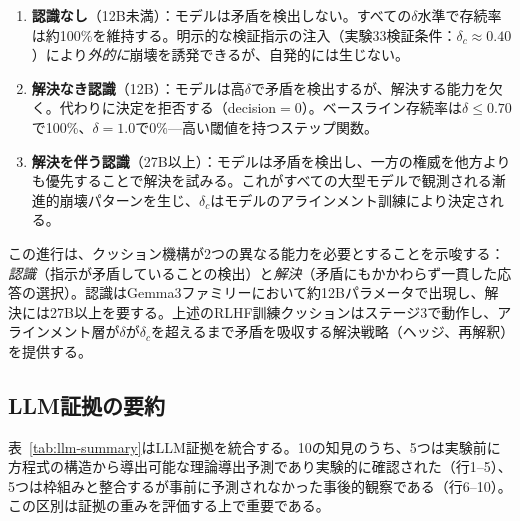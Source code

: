 \documentclass[11pt,a4paper]{article}
\begin{document}
\begin{enumerate}
    \item \textbf{認識なし}（12B未満）：モデルは矛盾を検出しない。すべての$\delta$水準で存続率は約100\%を維持する。明示的な検証指示の注入（実験33検証条件：$\delta_c \approx 0.40$）により\emph{外的に}崩壊を誘発できるが、自発的には生じない。

    \item \textbf{解決なき認識}（12B）：モデルは高$\delta$で矛盾を検出するが、解決する能力を欠く。代わりに決定を拒否する（decision${}= 0$）。ベースライン存続率は$\delta \leq 0.70$で100\%、$\delta = 1.0$で0\%---高い閾値を持つステップ関数。

    \item \textbf{解決を伴う認識}（27B以上）：モデルは矛盾を検出し、一方の権威を他方よりも優先することで解決を試みる。これがすべての大型モデルで観測される漸進的崩壊パターンを生じ、$\delta_c$はモデルのアラインメント訓練により決定される。
\end{enumerate}

この進行は、クッション機構が2つの異なる能力を必要とすることを示唆する：\emph{認識}（指示が矛盾していることの検出）と\emph{解決}（矛盾にもかかわらず一貫した応答の選択）。認識はGemma3ファミリーにおいて約12Bパラメータで出現し、解決には27B以上を要する。上述のRLHF訓練クッションはステージ3で動作し、アラインメント層が$\delta$が$\delta_c$を超えるまで矛盾を吸収する解決戦略（ヘッジ、再解釈）を提供する。

\subsection{LLM証拠の要約}

表~\ref{tab:llm-summary}はLLM証拠を統合する。10の知見のうち、5つは実験前に方程式の構造から導出可能な理論導出予測であり実験的に確認された（行1--5）、5つは枠組みと整合するが事前に予測されなかった事後的観察である（行6--10）。この区別は証拠の重みを評価する上で重要である。
\end{document}
